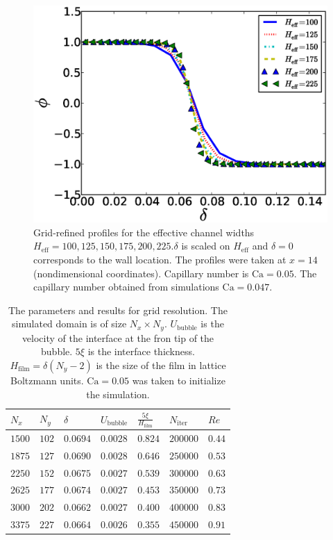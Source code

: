 \documentclass[preprint,12pt]{elsarticle}
\newcommand{\Ca}{\mathrm{Ca}}
\begin{document}
\begin{figure}
\includegraphics[width=\textwidth]{Figures/Grid/norm_grid_profs.eps}
\caption{Grid-refined profiles for the effective
channel widths
$H_{\mathrm{eff}}=100,125,150,175,200,225$.$\delta$ is scaled on $H_{\mathrm{eff}}$ and $\delta=0$
corresponds to the wall location. The profiles were taken at $x=14$ (nondimensional coordinates).
Capillary number is $\Ca=0.05$. The capillary number obtained from simulations $\Ca=0.047$. 
\label{fig:grid:profiles}}
\end{figure}
\begin{table}
\begin{tabularx}{\textwidth}{|X|X|X|X|X|X|X|}
\hline
$N_x$&$N_y$&$\delta$&$U_\mathrm{bubble}$&$\frac{5\xi}{H_{\mathrm{film}}}$&$N_\mathrm{iter}$&{
\color{red} $Re$}\\
\hline
$1500$&$102$&$0.0694$&$0.0028$&$0.824$&$200000$&$0.44$\\
\hline
$1875$&$127$&$0.0690$&$0.0028$&$0.646$&$250000$&$0.53$\\
\hline
$2250$&$152$&$0.0675$&$0.0027$&$0.539$&$300000$&$0.63$\\
\hline
$2625$&$177$&$0.0674$&$0.0027$&$0.453$&$350000$&$0.73$\\
\hline
$3000$&$202$&$0.0662$&$0.0027$&$0.400$&$400000$&$0.83$\\
\hline
$3375$&$227$&$0.0664$&$0.0026$&$0.355$&$450000$&$0.91$\\
\hline
\end{tabularx}
\caption{The parameters and results for grid resolution. The simulated domain is
of size $N_x \times N_y$. $U_\mathrm{bubble}$ is the velocity of the interface at the fron tip of
the bubble.  $5\xi$ is the interface thickness. $H_{\mathrm{film}}=\delta (N_y-2)$ is the size of
the film in
lattice Boltzmann units. $\Ca=0.05$ was taken to initialize the simulation.
\label{table:parameters:grid:refinement}}
\end{table}
\end{document}
